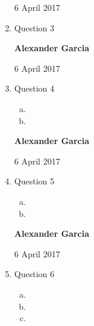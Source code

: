 \documentclass[11pt]{article}
\begin{document}
\begin{enumerate}
		6 April 2017 \\

	\item Question 3

		\newpage

		\textbf{Alexander Garcia}

		6 April 2017 \\

	\item Question 4

		\begin{enumerate}[(a)]

			\item

			\item

		\end{enumerate}

		\newpage

		\textbf{Alexander Garcia}

		6 April 2017 \\

	\item Question 5

		\begin{enumerate}[(a)]

			\item

			\item

		\end{enumerate}

		\newpage

		\textbf{Alexander Garcia}

		6 April 2017 \\

	\item Question 6

		\begin{enumerate}[(a)]

			\item

			\item

			\item

		\end{enumerate}

\end{enumerate}
\end{document}
